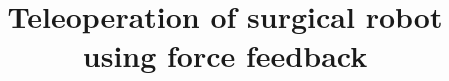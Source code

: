 \documentclass[conference]{IEEEtran}
\begin{document}


\graphicspath{ {../Worksheets/rapport/pictures/} }


\title{Teleoperation of surgical robot using force feedback}


\author{
\and
{}
\and
{}
\and
{}
}


%








\maketitle
\end{document}
